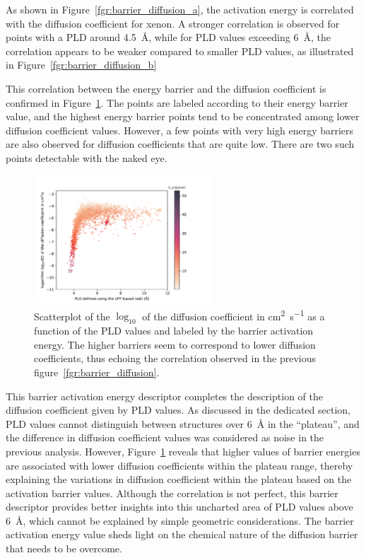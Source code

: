 \documentclass[main]{subfiles}
\begin{document}
As shown in Figure~\ref{fgr:barrier_diffusion_a}, the activation energy is correlated with the diffusion coefficient for xenon. A stronger correlation is observed for points with a PLD around \SI{4.5}{\angstrom}, while for PLD values exceeding \SI{6}{\angstrom}, the correlation appears to be weaker compared to smaller PLD values, as illustrated in Figure~\ref{fgr:barrier_diffusion_b}

This correlation between the energy barrier and the diffusion coefficient is confirmed in Figure~\ref{fgr:diff_pld_barrier}. The points are labeled according to their energy barrier value, and the highest energy barrier points tend to be concentrated among lower diffusion coefficient values. However, a few points with very high energy barriers are also observed for diffusion coefficients that are quite low. There are two such points detectable with the naked eye. 

\begin{figure}[ht]
  \centering
    \includegraphics[width=0.6\textwidth]{figures/5-diffusion/difflog_Df-uff298K_barrier.pdf}
    \caption{ Scatterplot of the $\log_{10}$ of the diffusion coefficient in \si{\square\cm\per\s} as a function of the PLD values and labeled by the barrier activation energy. The higher barriers seem to correspond to lower diffusion coefficients, thus echoing the correlation observed in the previous figure~\ref{fgr:barrier_diffusion}.}\label{fgr:diff_pld_barrier}
\end{figure}

This barrier activation energy descriptor completes the description of the diffusion coefficient given by PLD values. As discussed in the dedicated section, PLD values cannot distinguish between structures over \SI{6}{\angstrom} in the ``plateau'', and the difference in diffusion coefficient values was considered as noise in the previous analysis. However, Figure~\ref{fgr:diff_pld_barrier} reveals that higher values of barrier energies are associated with lower diffusion coefficients within the plateau range, thereby explaining the variations in diffusion coefficient within the plateau based on the activation barrier values.
Although the correlation is not perfect, this barrier descriptor provides better insights into this uncharted area of PLD values above \SI{6}{\angstrom}, which cannot be explained by simple geometric considerations. The barrier activation energy value sheds light on the chemical nature of the diffusion barrier that needs to be overcome.
\end{document}
